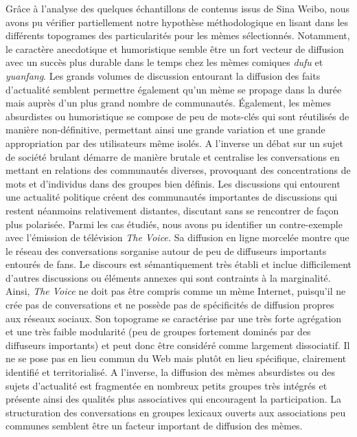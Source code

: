 Gr\^ace \`a l{\textquoteright}analyse des quelques \'echantillons de contenus issus de Sina Weibo, nous avons pu v\'erifier partiellement notre hypoth\`ese m\'ethodologique en lisant dans les diff\'erents topogrames des particularit\'es pour les m\`emes s\'electionn\'es. Notamment, le caract\`ere anecdotique et humoristique semble \^etre un fort vecteur de diffusion avec un succ\`es plus durable dans le temps chez les m\`emes comiques \textit{dufu} et \textit{yuanfang}. Les grands volumes de discussion entourant la diffusion des faits d{\textquoteright}actualit\'e semblent permettre \'egalement qu{\textquoteright}un m\`eme se propage dans la dur\'ee mais aupr\`es d{\textquoteright}un plus grand nombre de communaut\'es. \'Egalement, les m\`emes absurdistes ou humoristique se compose de peu de mots-cl\'es qui sont r\'eutilis\'es de mani\`ere non-d\'efinitive, permettant ainsi une grande variation et une grande appropriation par des utilisateurs m\^eme isol\'es. A l{\textquoteright}inverse un d\'ebat sur un sujet de soci\'et\'e brulant d\'emarre de mani\`ere brutale et centralise les conversations en mettant en relations des communaut\'es diverses, provoquant des concentrations de mots et d{\textquoteright}individus dans des groupes bien d\'efinis. Les discussions qui entourent une actualit\'e politique cr\'eent des communaut\'es importantes de discussions qui restent n\'eanmoins relativement distantes, discutant sans se rencontrer de fa\c{c}on plus polaris\'ee. Parmi les cas \'etudi\'es, nous avons pu identifier un contre-exemple avec l{\textquoteright}\'emission de t\'el\'evision \textit{The Voice}\textit{. }Sa diffusion en ligne morcel\'ee montre que le r\'eseau des conversations s{\textquotesingle}organise autour de peu de diffuseurs importants entour\'es de fans. Le discours est s\'emantiquement tr\`es \'etabli et inclue difficilement d{\textquoteright}autres discussions ou \'el\'ements annexes qui sont contraints \`a la marginalit\'e. Ainsi, \textit{The Voice }ne doit pas \^etre compris comme un m\`eme Internet, puisqu{\textquoteright}il ne cr\'ee pas de conversations et ne poss\`ede pas de sp\'ecificit\'es de diffusion propres aux r\'eseaux sociaux. Son topograme se caract\'erise par une tr\`es forte agr\'egation et une tr\`es faible modularit\'e (peu de groupes fortement domin\'es par des diffuseurs importants) et peut donc \^etre consid\'er\'e comme largement dissociatif. Il ne se pose pas en lieu commun du Web mais plut\^ot en lieu sp\'ecifique, clairement identifi\'e et territorialis\'e. A l{\textquoteright}inverse, la diffusion des m\`emes absurdistes ou des sujets d{\textquoteright}actualit\'e est fragment\'ee en nombreux petits groupes tr\`es int\'egr\'es et pr\'esente ainsi des qualit\'es plus associatives qui encouragent la participation. La structuration des conversations en groupes lexicaux ouverts aux associations peu communes semblent \^etre un facteur important de diffusion des m\`emes.
 

